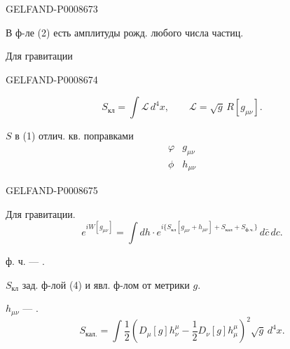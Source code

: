 \begin{GelfandAdjacentEvidence}{GELFAND-P000867}{3}


В ф-ле (2) есть амплитуды рожд. любого числа частиц.

Для гравитации

\end{GelfandAdjacentEvidence}
\begin{GelfandAdjacentEvidence}{GELFAND-P000867}{4}

\begin{equation*}
S_{\text{кл}}=\int\mathcal{L}\,d^4x,\qquad
\mathcal{L}=\sqrt{g}\,R[g_{\mu\nu}]. \tag{4}
\end{equation*}

$S$ в (1) отлич. кв. поправками
\begin{equation*}
\begin{array}{cc}
\varphi&g_{\mu\nu}\\
\phi&h_{\mu\nu}
\end{array} \tag{5}
\end{equation*}
\end{GelfandAdjacentEvidence}
\begin{GelfandAdjacentEvidence}{GELFAND-P000867}{5}

Для гравитации.
\begin{equation*}
e^{iW[g_{\mu\nu}]}=\int dh\cdot
 e^{i\{S_{\text{кл}}[g_{\mu\nu}+h_{\mu\nu}]+S_{\text{кал}}+S_{\text{ф.ч.}}\}}\,
 d\bar c\,dc. \tag{6}
\end{equation*}

ф. ч. --- .

$S_{\text{кл}}$ зад. ф-лой (4) и явл. ф-лом от метрики $g$.

$h_{\mu\nu}$ --- .
\begin{equation*}
S_{\text{кал.}}=\int\frac12
\left(D_\mu[g]h^{\mu}_{\nu}-\frac12 D_\nu[g]h_{\mu}^{\mu}\right)^2
\sqrt{g}\,d^4x. \tag{7}
\end{equation*}
\end{GelfandAdjacentEvidence}
